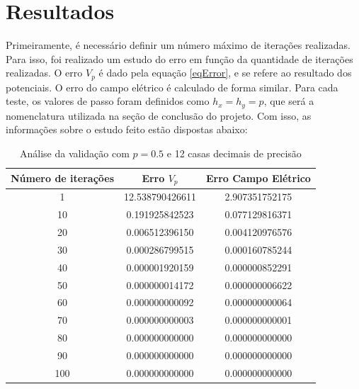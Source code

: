 \documentclass[oneside]{abntex2}
\begin{document}
\section{Resultados}
Primeiramente, é necessário definir um número máximo de iterações realizadas. Para isso, foi realizado um estudo do erro em função da quantidade de iterações realizadas. O erro $V_p$ é dado pela equação \eqref{eqError}, e se refere ao resultado dos potenciais. O erro do campo elétrico é calculado de forma similar. Para cada teste, os valores de passo foram definidos como $h_x = h_y = p$, que será a nomenclatura utilizada na seção de conclusão do projeto. Com isso, as informações sobre o estudo feito estão dispostas abaixo:

\begin{table}[h]
    \centering
    \begin{tabular}{c|c|c}
    Número de iterações &Erro $V_p$ &Erro Campo Elétrico  \\
    \hline
    1 & 12.538790426611 & 2.907351752175 \\
    10 & 0.191925842523 & 0.077129816371 \\
    20 & 0.006512396150 & 0.004120976576 \\
    30 & 0.000286799515 & 0.000160785244 \\
    40 & 0.000001920159 & 0.000000852291 \\
    50 & 0.000000014172 & 0.000000006622 \\
    60 & 0.000000000092 & 0.000000000064 \\
    70 & 0.000000000003 & 0.000000000001 \\
    80 & 0.000000000000 & 0.000000000000 \\
    90 & 0.000000000000 & 0.000000000000 \\
    100 & 0.000000000000 & 0.000000000000 \\
    \end{tabular}
    \caption{Análise da validação com $p = 0.5$ e 12 casas decimais de precisão}
    \label{tab:iter_p05}
\end{table}
\end{document}
